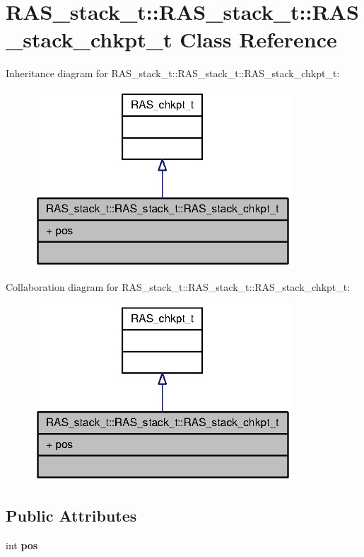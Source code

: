 \section{RAS\_\-stack\_\-t::RAS\_\-stack\_\-t::RAS\_\-stack\_\-chkpt\_\-t Class Reference}
\label{classRAS__stack__t_1_1RAS__stack__chkpt__t}
Inheritance diagram for RAS\_\-stack\_\-t::RAS\_\-stack\_\-t::RAS\_\-stack\_\-chkpt\_\-t:\nopagebreak
\begin{figure}[H]
\begin{center}
\leavevmode
\includegraphics[width=274pt]{classRAS__stack__t_1_1RAS__stack__chkpt__t__inherit__graph}
\end{center}
\end{figure}
Collaboration diagram for RAS\_\-stack\_\-t::RAS\_\-stack\_\-t::RAS\_\-stack\_\-chkpt\_\-t:\nopagebreak
\begin{figure}[H]
\begin{center}
\leavevmode
\includegraphics[width=274pt]{classRAS__stack__t_1_1RAS__stack__chkpt__t__coll__graph}
\end{center}
\end{figure}
\subsection*{Public Attributes}
\begin{CompactItemize}
\item 
int {\bf pos}
\end{CompactItemize}


